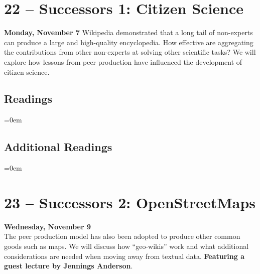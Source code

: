 \documentclass[10pt]{memoir}
\newenvironment{readinglist}{
\begin{list}{}{\leftmargin=8pt \itemindent=0em}
  \setlength{\itemsep}{8pt}
  \setlength{\parskip}{0em}
  \setlength{\parsep}{1em}
  \setlength{\parindent}{8em}}
{\end{list}}
\begin{document}
\section{22 -- Successors 1: Citizen Science}
\textcolor{CUGold}{\textbf{Monday, November 7}}
Wikipedia demonstrated that a long tail of non-experts can produce a large and high-quality encyclopedia. How effective are aggregating the contributions from other non-experts at solving other scientific tasks? We will explore how lessons from peer production have influenced the development of citizen science.

    \subsection{Readings}
    \begin{readinglist}
        \item {}
        \item {}
    \end{readinglist}
    
    \subsection{Additional Readings}
    \begin{readinglist}
        \item {}
        \item {}
        \item {}
        \item {}
        \item {}
        \item {}
        \item {}
    \end{readinglist}
    

\section{23 -- Successors 2: OpenStreetMaps}
\textcolor{CUGold}{\textbf{Wednesday, November 9}}\\
The peer production model has also been adopted to produce other common goods such as maps. We will discuss how ``geo-wikis'' work and what additional considerations are needed when moving away from textual data. \textbf{Featuring a guest lecture by Jennings Anderson}.
\end{document}

